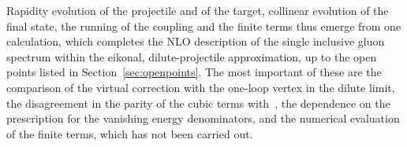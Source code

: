 Rapidity evolution of the projectile and of the target, collinear evolution of the final state, the running of the coupling and the finite terms thus emerge from one calculation, which completes the NLO description of the single inclusive gluon spectrum within the eikonal, dilute-projectile approximation, up to the open points listed in Section~\ref{sec:openpoints}. The most important of these are the comparison of the virtual correction with the one-loop vertex in the dilute limit, the disagreement in the parity of the cubic terms with~\cite{Li:2021ntm}, the dependence on the prescription for the vanishing energy denominators, and the numerical evaluation of the finite terms, which has not been carried out.
